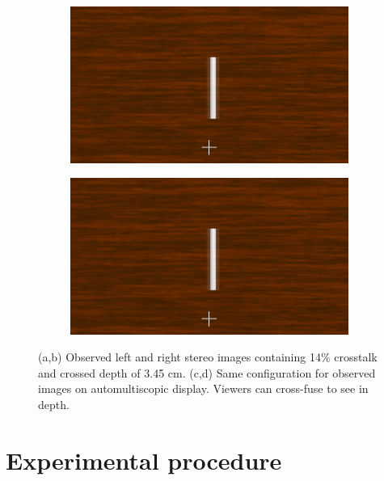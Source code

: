 \begin{figure}[htbp]
    \begin{subfigure}[b]{0.5\textwidth}
        \includegraphics[width=\textwidth]{./Template_Figures/auto_ghost_left}
        \caption{}\label{fig:obs_aut_left}
    \end{subfigure}
    \begin{subfigure}[b]{0.5\textwidth}
        \includegraphics[width=\textwidth]{./Template_Figures/auto_ghost_left}
        \caption{}\label{fig:obs_aut_right}
    \end{subfigure}
    \caption{(a,b) Observed left and right stereo images containing 14\% crosstalk and crossed depth of 3.45 cm. (c,d) Same configuration for observed images on automultiscopic display. Viewers can cross-fuse to see in depth.\label{fig:observed_ct_images}}
\end{figure}

\section{Experimental procedure}
